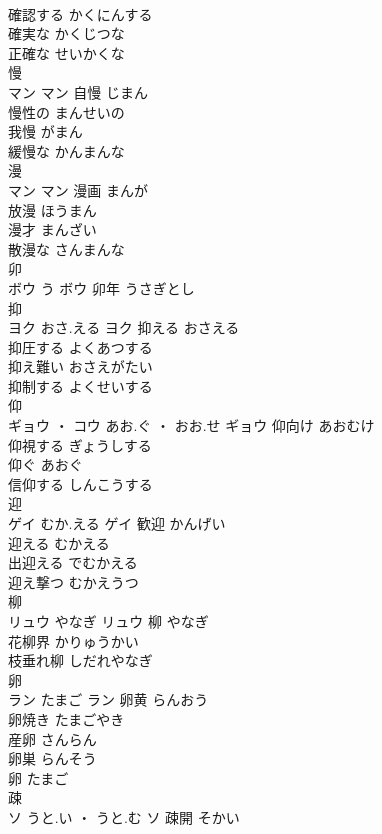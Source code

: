 \documentclass[8pt]{extreport}
\begin{document}
\begin{CJK}{UTF8}{min}
\\	確認する	かくにんする	
\\	確実な	かくじつな	
\\	正確な	せいかくな	
\\	慢	
\\	マン		マン	自慢	じまん	
\\	慢性の	まんせいの	
\\	我慢	がまん	
\\	緩慢な	かんまんな	
\\	漫	
\\	マン		マン	漫画	まんが	
\\	放漫	ほうまん	
\\	漫才	まんざい	
\\	散漫な	さんまんな	
\\	卯	
\\	ボウ	う	ボウ	卯年	うさぎとし	
\\	抑	
\\	ヨク	おさ.える	ヨク	抑える	おさえる	
\\	抑圧する	よくあつする	
\\	抑え難い	おさえがたい	
\\	抑制する	よくせいする	
\\	仰	
\\	ギョウ ・ コウ	あお.ぐ ・ おお.せ	ギョウ	仰向け	あおむけ	
\\	仰視する	ぎょうしする	
\\	仰ぐ	あおぐ	
\\	信仰する	しんこうする	
\\	迎	
\\	ゲイ	むか.える	ゲイ	歓迎	かんげい	
\\	迎える	むかえる	
\\	出迎える	でむかえる	
\\	迎え撃つ	むかえうつ	
\\	柳	
\\	リュウ	やなぎ	リュウ													柳	やなぎ	
\\	花柳界	かりゅうかい	
\\	枝垂れ柳	しだれやなぎ	
\\	卵	
\\	ラン	たまご	ラン	卵黄	らんおう	
\\	卵焼き	たまごやき	
\\	産卵	さんらん	
\\	卵巣	らんそう	
\\	卵	たまご	
\\	疎	
\\	ソ	うと.い ・ うと.む	ソ	疎開	そかい	

\end{CJK}
\end{document}
